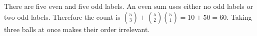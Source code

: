 There are five even and five odd labels. An even sum uses either no odd labels or two odd labels. Therefore the count is $\binom53+\binom52\binom51=10+50=\boxed{60}$. Taking three balls at once makes their order irrelevant.
